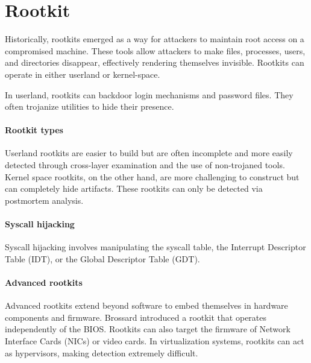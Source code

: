 \section{Rootkit}

Historically, rootkits emerged as a way for attackers to maintain root access on a compromised machine. 
These tools allow attackers to make files, processes, users, and directories disappear, effectively rendering themselves invisible.
Rootkits can operate in either userland or kernel-space.

In userland, rootkits can backdoor login mechanisms and password files. 
They often trojanize utilities to hide their presence. 

\paragraph*{Rootkit types}
Userland rootkits are easier to build but are often incomplete and more easily detected through cross-layer examination and the use of non-trojaned tools. 
Kernel space rootkits, on the other hand, are more challenging to construct but can completely hide artifacts. 
These rootkits can only be detected via postmortem analysis. 

\paragraph*{Syscall hijacking}
Syscall hijacking involves manipulating the syscall table, the Interrupt Descriptor Table (IDT), or the Global Descriptor Table (GDT). 

\paragraph*{Advanced rootkits}
Advanced rootkits extend beyond software to embed themselves in hardware components and firmware. 
Brossard introduced a rootkit that operates independently of the BIOS. 
Rootkits can also target the firmware of Network Interface Cards (NICs) or video cards. 
In virtualization systems, rootkits can act as hypervisors, making detection extremely difficult.